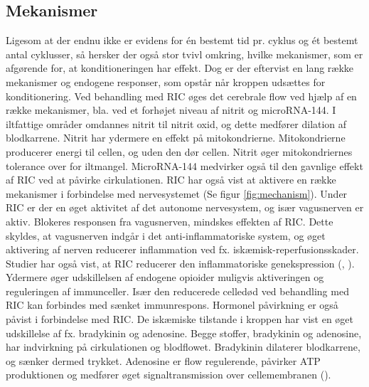 \subsection{Mekanismer}
Ligesom at der endnu ikke er evidens for én bestemt tid pr. cyklus og ét bestemt antal cyklusser, så hersker der også stor tvivl omkring, hvilke mekanismer, som er afgørende for, at konditioneringen har effekt.  Dog er der eftervist en lang række mekanismer og endogene responser, som opstår når kroppen udsættes for konditionering. Ved behandling med RIC øges det cerebrale flow ved hjælp af en række mekanismer, bla. ved et forhøjet niveau af nitrit og microRNA-144. I iltfattige områder omdannes nitrit til nitrit oxid, og dette medfører dilation af blodkarrene. Nitrit har ydermere en effekt på mitokondrierne. Mitokondrierne producerer energi til cellen, og uden den dør cellen. Nitrit øger mitokondriernes tolerance over for iltmangel. MicroRNA-144 medvirker også til den gavnlige effekt af RIC ved at påvirke cirkulationen.
RIC har også vist at aktivere en række mekanismer i forbindelse med nervesystemet (Se figur \ref{fig:mechanism}). Under RIC er der en øget aktivitet af det autonome nervesystem, og især vagusnerven er aktiv. Blokeres responsen fra vagusnerven, mindskes effekten af RIC. Dette skyldes, at vagusnerven indgår i det anti-inflammatoriske system, og øget aktivering af nerven reducerer inflammation ved fx. iskæmisk-reperfusionsskader. Studier har også vist, at RIC reducerer den inflammatoriske genekspression (\cite{RefWorks:20}, \cite{RefWorks:3}). Ydermere  øger udskillelsen af endogene opioider muligvis aktiveringen og reguleringen af immunceller. Især den reducerede celledød ved behandling med RIC kan forbindes med sænket immunrespons. Hormonel påvirkning er også påvist i forbindelse med RIC. De iskæmiske tilstande i kroppen har vist en øget udskillelse af fx. bradykinin og adenosine. Begge stoffer, bradykinin og adenosine, har indvirkning på cirkulationen og blodflowet. Bradykinin dilaterer blodkarrene, og sænker dermed trykket. Adenosine er flow regulerende, påvirker ATP produktionen og medfører øget signaltransmission over cellemembranen (\cite{RefWorks:3}).

